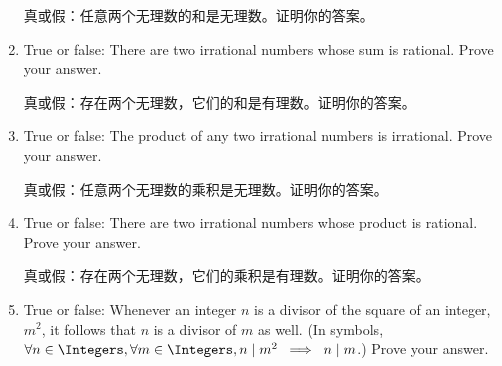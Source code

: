 \begin{enumerate}
    真或假：任意两个无理数的和是无理数。证明你的答案。
    
    
    \wbvfill
    
    \hintspagebreak
    
    \item True or false:  There are two irrational numbers whose sum is rational.
    Prove your answer.
    
    真或假：存在两个无理数，它们的和是有理数。证明你的答案。
    
    
    \wbvfill
    
    \item True or false: The product of any two irrational numbers is irrational.
    Prove your answer.
    
    真或假：任意两个无理数的乘积是无理数。证明你的答案。
    
    
    \wbvfill
    
    \item True or false: There are two irrational numbers whose product is rational.
    Prove your answer.
    
    真或假：存在两个无理数，它们的乘积是有理数。证明你的答案。
    
    \wbvfill
    
    \workbookpagebreak
    
    \item True or false:  Whenever an integer $n$ is a divisor of the square of an integer, $m^2$, it follows that $n$ is a divisor of $m$ as well.
    (In symbols, $\forall n \in \Integers, \forall m \in \Integers, n \mid m^2 \; \implies \; n \mid m$.)
    Prove your answer.
    

\end{enumerate}
